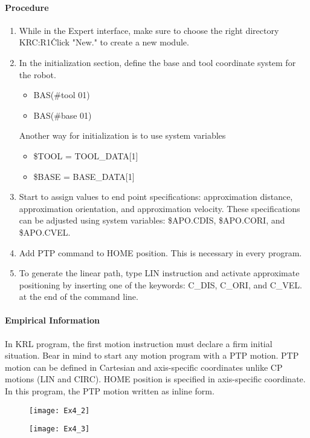 \paragraph{Procedure}
\begin{enumerate}
	\item While in the Expert interface, make sure to choose the right directory KRC:R1\.Click "New." to create a new module.
	\item In the initialization section, define the base and tool coordinate system for the robot.
	\begin{itemize}
		\item BAS(\#tool 01)
		\item BAS(\#base 01)
	\end{itemize}
		Another way for initialization is to use system variables
		\begin{itemize} 
		\item \$TOOL = TOOL\_DATA[1]
		\item \$BASE = BASE\_DATA[1]
	\end{itemize}
\item Start to assign values to end point specifications: approximation distance, approximation orientation, and approximation velocity. These specifications can be adjusted using system variables: \$APO.CDIS, \$APO.CORI, and \$APO.CVEL.
\item Add PTP command to HOME position. This is necessary in every program.
\item To generate the linear path, type LIN instruction and activate approximate positioning by inserting one of the keywords: C\_DIS, C\_ORI, and C\_VEL. at the end of the command line.

\end{enumerate}
\paragraph{Empirical Information}
In KRL program, the first motion instruction must declare a firm initial situation. Bear in mind to start any motion program with a PTP motion. PTP motion can be defined in Cartesian and axis-specific coordinates unlike CP motions (LIN and CIRC). 
HOME position is specified in axis-specific coordinate. In this program, the PTP motion written as inline form.
\begin{figure}[H]
	\centering
	\texttt{[image: Ex4\_2]}
\end{figure}
\begin{figure}[H]
	\centering
	\texttt{[image: Ex4\_3]}
\end{figure}
\newpage
